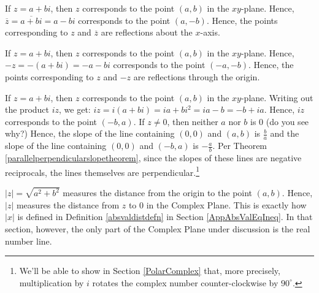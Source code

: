 \begin{exenum}

\item If $z = a+bi$, then $z$ corresponds to the point $(a,b)$ in the $xy$-plane.  Hence, $\overline{z} = \overline{a+bi} = a-bi$ corresponds to the point $(a,-b)$.  Hence, the points corresponding to $z$ and $\overline{z}$ are reflections about the $x$-axis.

\item    If $z = a+bi$, then $z$ corresponds to the point $(a,b)$ in the $xy$-plane.  Hence, $-z =-(a+bi) = -a-bi$ corresponds to the point $(-a,-b)$.  Hence, the points corresponding to $z$ and $-z$ are reflections through the origin.

\item  If $z = a+bi$, then $z$ corresponds to the point $(a,b)$ in the $xy$-plane.  Writing out the product $iz$, we get: $iz =i(a+bi) = ia+bi^2 = ia - b = -b+ia$.  Hence, $iz$ corresponds to the point $(-b,a)$.  If $z \neq 0$, then neither $a$ nor $b$ is $0$ (do you see why?) Hence, the slope of the line containing $(0,0)$ and $(a,b)$ is $\frac{b}{a}$ and the slope of the line containing $(0,0)$ and $(-b,a)$ is $-\frac{a}{b}$.  Per Theorem \ref{parallelperpendicularslopetheorem}, since the slopes of these lines are negative reciprocals, the lines themselves are perpendicular.\footnote{We'll be able to show in Section \ref{PolarComplex}  that, more precisely, multiplication by $i$ rotates the complex number counter-clockwise by $90^{\circ}$.}

\item $|z| = \sqrt{a^2+b^2}$ measures the distance from the origin to the point $(a,b)$.  Hence, $|z|$ measures the distance from $z$ to $0$ in the Complex Plane.  This is exactly how $|x|$ is defined in Definition \ref{absvaldistdefn} in Section \ref{AppAbsValEqIneq}.  In that section, however,  the only part of the Complex Plane under discussion is the real number line.

\end{exenum}


